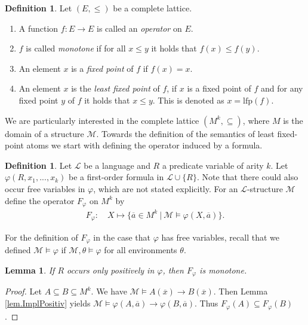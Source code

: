 \documentclass[acmsmall]{acmart}
\theoremstyle{plain}
\newtheorem{lemma}[theorem]{Lemma}
\theoremstyle{definition}
\newtheorem{definition}[theorem]{Definition}
\newcommand{\calL}{\mathcal{L}}
\newcommand{\calM}{\mathcal{M}}
\renewcommand{\phi}{\varphi}
\newcommand{\mybar}[1]{\overline{#1}}
\newcommand{\impl}{\rightarrow} %
\newcommand{\lfp}{\mathrm{lfp}} %
\begin{document}
\begin{definition}
	Let $(E,\leq)$ be a complete lattice.
	\begin{enumerate}
		\item  A function $f: E \impl E$ is called an \emph{operator} on $E$.
		\item $f$ is called \emph{monotone} if for all $x \leq y$ it holds that $f(x) \leq f(y)$.
		\item An element $x$ is a \emph{fixed point} of $f$ if $f(x) = x$.
		\item An element $x$ is the \emph{least fixed point} of $f$, if $x$ is a fixed point of $f$ and for any fixed point $y$ of $f$ it holds that $x \leq y$. This is denoted as $x = \lfp(f)$.
	\end{enumerate}
\end{definition}
%
%
We are particularly interested in the complete lattice $(M^k,\subseteq)$, where $M$ is
 the domain of a structure $\calM$.
Towards the definition of the semantics of least fixed-point atoms we start with defining
 the operator induced by a formula.
%
\begin{definition}\label{def.fixedPointOperator}
        Let $\calL$ be a language and $R$ a predicate variable of arity $k$. Let $\varphi(R,x_1,...,x_k)$ be a first-order formula in $\calL \cup \{R\}$. Note that there could also occur free variables in $\phi$, which are not stated explicitly.
        For an $\calL$-structure $\calM$ define the operator $F_{\varphi}$ on $M^k$ by
	\begin{align*}
		F_{\varphi}: \quad X \mapsto \{\mybar{a} \in M^k ~|~ \calM \models \varphi(X,\mybar{a}) \}.
	\end{align*}
\end{definition}
For the definition of $F_{\phi}$ in the case that $\phi$ has free variables, recall that we defined $\mathcal{M} \models \varphi$ if $\mathcal{M},\theta \models \varphi$ for all environments $\theta$.

\begin{lemma}\label{lfpmonotoneLemma}
	If $R$ occurs only positively in $\varphi$, then $F_{\varphi}$ is monotone.
\end{lemma}
\begin{proof}
	Let $A \subseteq B \subseteq M^k$. We have $\calM \models A(\mybar{x}) \rightarrow B(\mybar{x})$. Then Lemma \ref{lem.ImplPositiv} yields $\calM \models \varphi(A,\mybar{a}) \rightarrow \varphi(B,\mybar{a})$. Thus $F_{\varphi}(A) \subseteq F_{\varphi}(B)$.
\end{proof}
\end{document}
